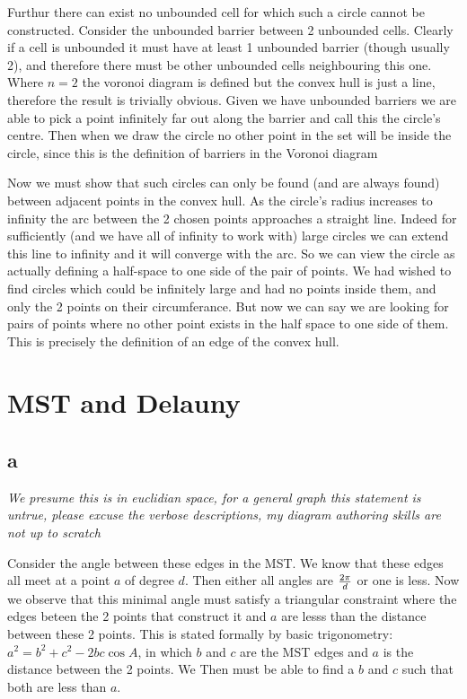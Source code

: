 \documentclass{article}
\begin{document}
Furthur there can exist no unbounded cell for which such a circle cannot be constructed.
Consider the unbounded barrier between 2 unbounded cells.
Clearly if a cell is unbounded it must have at least 1 unbounded barrier (though usually 2), and therefore there must be other unbounded cells neighbouring this one.
Where $n=2$ the voronoi diagram is defined but the convex hull is just a line, therefore the result is trivially obvious.
Given we have unbounded barriers we are able to pick a point infinitely far out along the barrier and call this the circle's centre.
Then when we draw the circle no other point in the set will be inside the circle, since this is the definition of barriers in the Voronoi diagram

Now we must show that such circles can only be found (and are always found) between adjacent points in the convex hull.
As the circle's radius increases to infinity the arc between the 2 chosen points approaches a straight line.
Indeed for sufficiently (and we have all of infinity to work with) large circles we can extend this line to infinity and it will converge with the arc.
So we can view the circle as actually defining a half-space to one side of the pair of points.
We had wished to find circles which could be infinitely large and had no points inside them, and only the 2 points on their circumferance.
But now we can say we are looking for pairs of points where no other point exists in the half space to one side of them.
This is precisely the definition of an edge of the convex hull.

\section {MST and Delauny}

\subsection*{a}
{\em We presume this is in euclidian space, for a general graph this statement is untrue, please excuse the verbose descriptions, my diagram authoring skills are not up to scratch}

Consider the angle between these edges in the MST.
We know that these edges all meet at a point $a$ of degree $d$.
Then either all angles are ${2\pi} \over d$ or one is less.
Now we observe that this minimal angle must satisfy a triangular constraint where the edges beteen the 2 points that construct it and $a$ are lesss than the distance between these 2 points.
This is stated formally by basic trigonometry: $a^2 = b^2 + c^2 - 2bc\cos{A}$, in which $b$ and $c$ are the MST edges and $a$ is the distance between the 2 points.
We Then must be able to find a $b$ and $c$ such that both are less than $a$.
\end{document}
